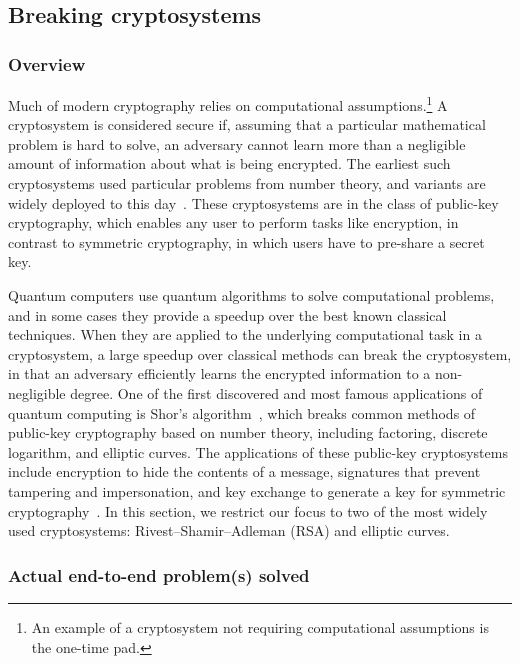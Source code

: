 \begin{refsection}

\subsection{Breaking cryptosystems} \label{appl:BreakingCrypto}

\subsubsection*{Overview}
Much of modern cryptography relies on computational assumptions.\footnote{An example of a cryptosystem not requiring computational assumptions is the one-time pad.} A cryptosystem is considered secure if, assuming that a particular mathematical problem is hard to solve, an adversary cannot learn more than a negligible amount of information about what is being encrypted. The earliest such cryptosystems used particular problems from number theory, and variants are widely deployed to this day~\cite{katz2021IntroCryptography}. These cryptosystems are in the class of public-key cryptography, which enables any user to perform tasks like encryption, in contrast to symmetric cryptography, in which users have to pre-share a secret key.

Quantum computers use quantum algorithms to solve computational problems, and in some cases they provide a speedup over the best known classical techniques. When they are applied to the underlying computational task in a cryptosystem, a large speedup over classical methods can break the cryptosystem, in that an adversary efficiently learns the encrypted information to a non-negligible degree. One of the first discovered and most famous applications of quantum computing is Shor's algorithm~\cite{shor1994Factoring}, which breaks common methods of public-key cryptography based on number theory, including factoring, discrete logarithm, and elliptic curves. The applications of these public-key cryptosystems include encryption to hide the contents of a message, signatures that prevent tampering and impersonation, and key exchange to generate a key for symmetric cryptography~\cite{bernstein2017PostQuantumCrypto}. In this section, we restrict our focus to two of the most widely used cryptosystems: Rivest--Shamir--Adleman (RSA) and elliptic curves.

\subsubsection*{Actual end-to-end problem(s) solved}


\end{refsection}

